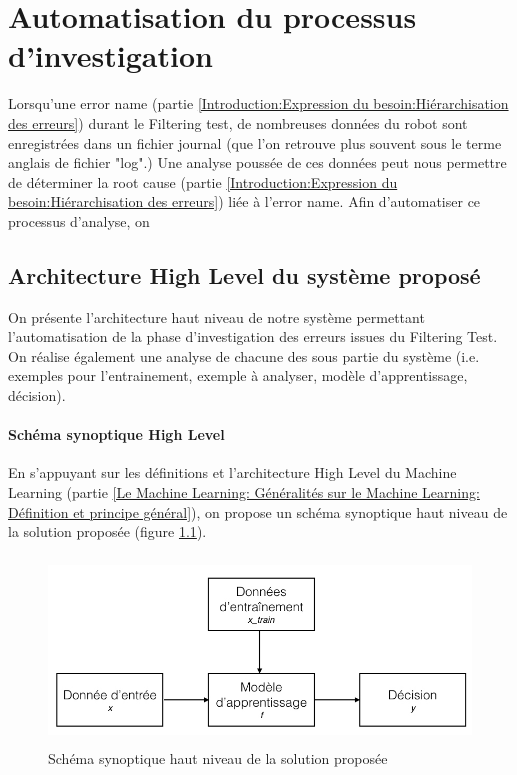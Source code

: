 \chapter{Automatisation du processus d'investigation}
\label{Automatisation du processus d'investigation}
\thispagestyle{fancy}
Lorsqu'une error name (partie \ref{Introduction:Expression du besoin:Hiérarchisation des erreurs}) durant le Filtering test, de nombreuses données du robot sont enregistrées dans un fichier journal (que l'on retrouve plus souvent sous le terme anglais de fichier "log".) Une analyse poussée de ces données peut nous permettre de déterminer la root cause (partie \ref{Introduction:Expression du besoin:Hiérarchisation des erreurs}) liée à l'error name. Afin d'automatiser ce processus d'analyse, on 

\section{Architecture High Level du système proposé}
\label{Automatisation du processus d'investigation: Achitecture High Level du système proposé}
On présente l'architecture haut niveau de notre système permettant l'automatisation de la phase d'investigation des erreurs issues du Filtering Test. On réalise également une analyse de chacune des sous partie du système (i.e. exemples pour l'entrainement, exemple à analyser, modèle d'apprentissage, décision).

\subsubsection{Schéma synoptique High Level}
\label{Automatisation du processus d'investigation: Achitecture High Level du système proposé: Schéma synoptique High Level}
En s'appuyant sur les définitions et l'architecture High Level du Machine Learning (partie \ref{Le Machine Learning: Généralités sur le Machine Learning: Définition et principe général}), on propose un schéma synoptique haut niveau de la solution proposée (figure \ref{fig:Schéma synoptique haut niveau de la solution proposée}).

\begin{figure}[h]
	\centering\includegraphics[height=5cm]{images/ML_high_level.jpeg}
	\caption{Schéma synoptique haut niveau de la solution proposée}
	\label{fig:Schéma synoptique haut niveau de la solution proposée}
\end{figure}

